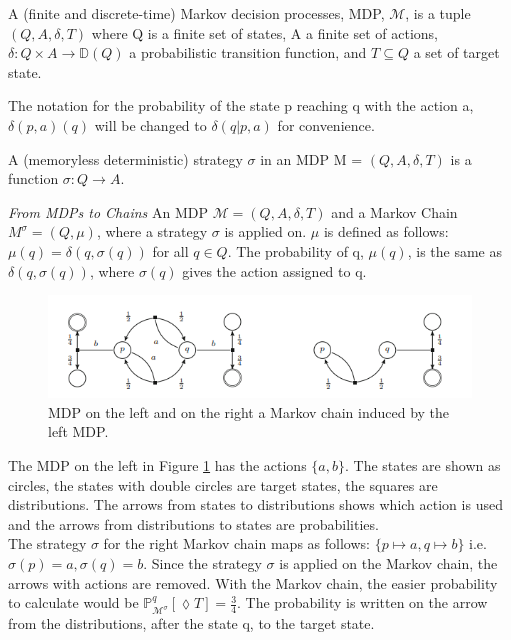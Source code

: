 \begin{definition}
\label{Markov decision processes}
A (finite and discrete-time) Markov decision processes, MDP, $\mathcal{M}$, is a tuple $(Q,A,\delta,T)$ 
where Q is a finite set of states, A a finite set of actions, $\delta: Q \times A \rightarrow \mathbb{D}(Q)$ 
a probabilistic transition function, and $T\subseteq Q$ a set of target state.
\end{definition}

\noindent
The notation for the probability of the state p reaching q with the action a, $\delta(p,a)(q)$ will be changed to 
$\delta(q|p,a)$ for convenience.

\begin{definition}[Strategies]
\label{Strategies}
A (memoryless deterministic) strategy $\sigma$ in an MDP M = $(Q,A,\delta,T)$ is a function $\sigma: Q\rightarrow A$.
\end{definition}

\noindent
\textit{From MDPs to Chains} An MDP $\mathcal{M} = (Q,A,\delta,T)$ and a Markov Chain $M^\sigma = (Q, \mu)$, 
where a strategy $\sigma$ is applied on. $\mu$ is defined as follows: $\mu(q)=\delta(q,\sigma(q))$ for all $q\in Q$.
The probability of q, $\mu(q)$, is the same as $\delta(q,\sigma(q))$, where $\sigma(q)$ gives the action assigned to q. 
\begin{figure}[htb]
	\begin{center}
		\includegraphics[width=1\linewidth]{pictures/strategies.png}
	\end{center}
	\caption{MDP on the left and 
    on the right a Markov chain induced by the left MDP. \cite{10.1007/978-3-319-89366-2_20}}
	\label{fig:strategies}
\end{figure}

\noindent
The MDP on the left in Figure \ref{fig:strategies} has the actions $\{a, b\}$. The states are shown as circles,
the states with double circles are target states, the squares are distributions. 
The arrows from states to distributions shows which action is used and the arrows from distributions to states are probabilities.
\newline
\\
The strategy $\sigma$ for the right Markov chain maps as follows: $\{p \mapsto a, q \mapsto b\}$ i.e. $\sigma(p) = a, \sigma(q) = b$.
Since the strategy $\sigma$ is applied on the Markov chain, the arrows with actions are removed. 
With the Markov chain, the easier probability to calculate would be $\mathbb{P}^{q}_{\mathcal{M}^\sigma}[\lozenge T] = \frac{3}{4}$.
The probability is written on the arrow from the distributions, after the state q, to the target state.

